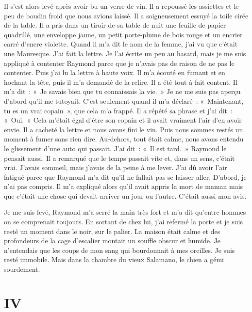 \documentclass[french,twoside]{book} %
\newcommand\chapteropen{} %
\newcommand\chapterclose{} %
\begin{document}
Il s’est alors levé après avoir bu un verre de vin. Il a repoussé les assiettes et le peu de boudin froid que nous avions laissé. Il a soigneusement essuyé la toile cirée de la table. Il a pris dans un tiroir de sa table de nuit une feuille de papier quadrillé, une enveloppe jaune, un petit porte-plume de bois rouge et un encrier carré d’encre violette. Quand il m’a dit le nom de la femme, j’ai vu que c’était une Mauresque. J'ai fait la lettre. Je l’ai écrite un peu au hasard, mais je me suis appliqué à contenter Raymond parce que je n’avais pas de raison de ne pas le contenter. Puis j’ai lu la lettre à haute voix. Il m’a écouté en fumant et en hochant la tête, puis il m’a demandé de la relire. Il a été tout à fait content. Il m’a dit : « Je savais bien que tu connaissais la vie. » Je ne me suis pas aperçu d’abord qu’il me tutoyait. C'est seulement quand il m’a déclaré : « Maintenant, tu es un vrai copain », que cela m’a frappé. Il a répété sa phrase et j’ai dit : « Oui. » Cela m’était égal d’être son copain et il avait vraiment l’air d’en avoir envie. Il a cacheté la lettre et nous avons fini le vin. Puis nous sommes restés un moment à fumer sans rien dire. Au-dehors, tout était calme, nous avons entendu le glissement d’une auto qui passait. J'ai dit : « Il est tard. » Raymond le pensait aussi. Il a remarqué que le temps passait vite et, dans un sens, c’était vrai. J'avais sommeil, mais j’avais de la peine à me lever. J'ai dû avoir l’air fatigué parce que Raymond m’a dit qu’il ne fallait pas se laisser aller. D'abord, je n’ai pas compris. Il m’a expliqué alors qu’il avait appris la mort de maman mais que c’était une chose qui devait arriver un jour ou l’autre. C'était aussi mon avis.\par
Je me suis levé, Raymond m’a serré la main très fort et m’a dit qu’entre hommes on se comprenait toujours. En sortant de chez lui, j’ai refermé la porte et je suis resté un moment dans le noir, sur le palier. La maison était calme et des profondeurs de la cage d’escalier montait un souffle obscur et humide. Je n’entendais que les coups de mon sang qui bourdonnait à mes oreilles. Je suis resté immobile. Mais dans la chambre du vieux Salamano, le chien a gémi sourdement.
\chapterclose


\chapteropen
\chapter[{IV}]{IV}
\label{I4}
\end{document}
